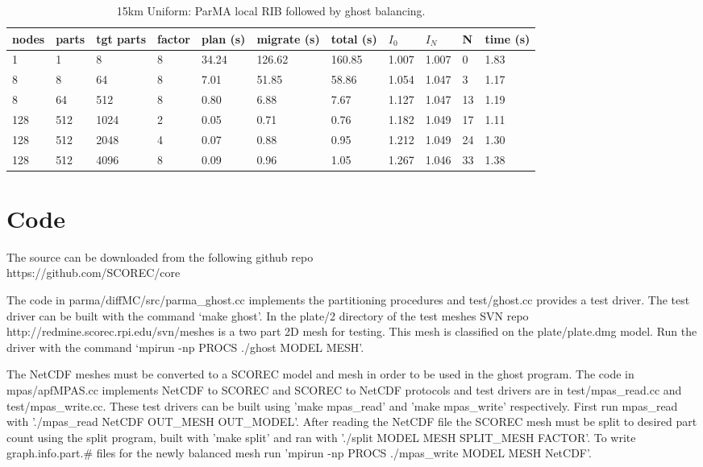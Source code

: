 \documentclass[a4paper]{article}
\begin{document}
\begin{table}
\caption{\label{tab:15kmplrib}15km Uniform: ParMA local RIB followed by ghost balancing.}
\begin{tabular}{  l | l | l | l | l | l | l | l | l | l | l }
    \hline
    nodes & parts & tgt parts & factor & plan (s) & migrate (s) & total (s) & $I_0$ & $I_N$ & N & time (s) \\ \hline
      1 & 1 & 8 & 8 & 34.24 & 126.62 & 160.85 & 1.007 & 1.007 & 0 & 1.83 \\ 
      8 & 8 & 64 & 8 & 7.01 & 51.85 & 58.86 & 1.054 & 1.047 & 3 & 1.17 \\ 
      8 & 64 & 512 & 8 & 0.80 & 6.88 & 7.67 & 1.127 & 1.047 & 13 & 1.19 \\ 
      128 & 512 & 1024 & 2 & 0.05 & 0.71 & 0.76 & 1.182 & 1.049 & 17 & 1.11 \\ 
      128 & 512 & 2048 & 4 & 0.07 & 0.88 & 0.95 & 1.212 & 1.049 & 24 & 1.30 \\ 
      128 & 512 & 4096 & 8 & 0.09 & 0.96 & 1.05 & 1.267 & 1.046 & 33 & 1.38 \\ 
\end{tabular}
\end{table}

\section{Code}

The source can be downloaded from the following github repo \\
https://github.com/SCOREC/core

The code in parma/diffMC/src/parma\_ghost.cc implements the partitioning procedures and test/ghost.cc provides a test driver.  The test driver can be built with the command `make ghost'.  In the plate/2 directory of the test meshes SVN repo http://redmine.scorec.rpi.edu/svn/meshes is a two part 2D mesh for testing.  This mesh is classified on the plate/plate.dmg model.  Run the driver with the command `mpirun -np PROCS ./ghost MODEL MESH'.

The NetCDF meshes must be converted to a SCOREC model and mesh in order to be used in the ghost program. The code in mpas/apfMPAS.cc implements NetCDF to SCOREC and SCOREC to NetCDF protocols and test drivers are in test/mpas\_read.cc and test/mpas\_write.cc. These test drivers can be built using 'make mpas\_read' and 'make mpas\_write' respectively. First run mpas\_read with './mpas\_read NetCDF OUT\_MESH OUT\_MODEL'. After reading the NetCDF file the SCOREC mesh must be split to desired part count using the split program, built with 'make split' and ran with './split MODEL MESH SPLIT\_MESH FACTOR'. To write graph.info.part.# files for the newly balanced mesh run 'mpirun -np PROCS ./mpas\_write MODEL MESH NetCDF'.

\newpage


\end{document}
